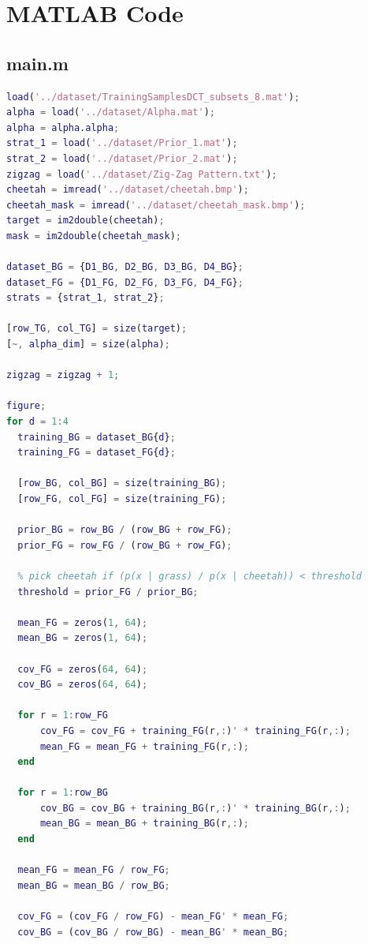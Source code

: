 \documentclass{article}
\begin{document}
\pagebreak

\section*{MATLAB Code}

\subsection*{main.m}

\begin{lstlisting}[language=Matlab]
load('../dataset/TrainingSamplesDCT_subsets_8.mat');
alpha = load('../dataset/Alpha.mat');
alpha = alpha.alpha;
strat_1 = load('../dataset/Prior_1.mat');
strat_2 = load('../dataset/Prior_2.mat');
zigzag = load('../dataset/Zig-Zag Pattern.txt');
cheetah = imread('../dataset/cheetah.bmp');
cheetah_mask = imread('../dataset/cheetah_mask.bmp');
target = im2double(cheetah);
mask = im2double(cheetah_mask);

dataset_BG = {D1_BG, D2_BG, D3_BG, D4_BG};
dataset_FG = {D1_FG, D2_FG, D3_FG, D4_FG};
strats = {strat_1, strat_2};

[row_TG, col_TG] = size(target);
[~, alpha_dim] = size(alpha);

zigzag = zigzag + 1;

figure;
for d = 1:4
  training_BG = dataset_BG{d};
  training_FG = dataset_FG{d};

  [row_BG, col_BG] = size(training_BG);
  [row_FG, col_FG] = size(training_FG);

  prior_BG = row_BG / (row_BG + row_FG);
  prior_FG = row_FG / (row_BG + row_FG);

  % pick cheetah if (p(x | grass) / p(x | cheetah)) < threshold
  threshold = prior_FG / prior_BG;

  mean_FG = zeros(1, 64);
  mean_BG = zeros(1, 64);

  cov_FG = zeros(64, 64);
  cov_BG = zeros(64, 64);

  for r = 1:row_FG
      cov_FG = cov_FG + training_FG(r,:)' * training_FG(r,:);
      mean_FG = mean_FG + training_FG(r,:);
  end

  for r = 1:row_BG
      cov_BG = cov_BG + training_BG(r,:)' * training_BG(r,:);
      mean_BG = mean_BG + training_BG(r,:);
  end

  mean_FG = mean_FG / row_FG;
  mean_BG = mean_BG / row_BG;

  cov_FG = (cov_FG / row_FG) - mean_FG' * mean_FG;
  cov_BG = (cov_BG / row_BG) - mean_BG' * mean_BG;


\end{lstlisting}
\end{document}
